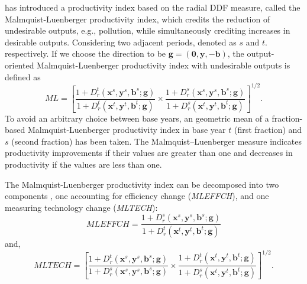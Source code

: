 \cite{Chung1997} has introduced a productivity index based on the radial DDF measure, called the Malmquist-Luenberger productivity index, which credits the reduction of undesirable outputs, e.g., pollution, while simultaneously crediting increases in desirable outputs. Considering two adjacent periods, denoted as $s$ and $t$. respectively. If we choose the direction to be ${\pmb{g}} = (\pmb{0},\pmb{y}, - \pmb{b})$, the output-oriented Malmquist-Luenberger productivity index with undesirable outputs is defined as
\begin{equation}\label{eq_mpi}
    \textit{ML} %
    = {\left[ {
    \frac{{1 + D _r^t({{\pmb{x}}^s},{{\pmb{y}}^s},{{\pmb{b}}^s};{\pmb{g}})}}{{1 + D _r^t({{\pmb{x}}^t},{{\pmb{y}}^t},{{\pmb{b}}^t};{\pmb{g}})}} \times \frac{{1 + D _r^s({{\pmb{x}}^s},{{\pmb{y}}^s},{{\pmb{b}}^s};{\pmb{g}})}}{{1 + D _r^s({{\pmb{x}}^t},{{\pmb{y}}^t},{{\pmb{b}}^t};{\pmb{g}})}}  } \right]^{1/2}}.
\end{equation}
To avoid an arbitrary choice between base years, an geometric mean of a fraction-based Malmquist-Luenberger productivity index in base year $t$ (first fraction) and $s$ (second fraction) has been taken. The Malmquist–Luenberger measure indicates productivity improvements if their values are greater than one and decreases in productivity if the values are less than one. 

The Malmquist-Luenberger productivity index can be decomposed into two components \citep{Chung1997}, one accounting for efficiency change (\textit{MLEFFCH}), and one measuring technology change (\textit{MLTECH}):
\begin{equation}
    \textit{MLEFFCH} %
    = \frac{{1 + D _r^s({{\pmb{x}}^s},{{\pmb{y}}^s},{{\pmb{b}}^s};{\pmb{g}})}}{{1 + D _r^t({{\pmb{x}}^t},{{\pmb{y}}^t},{{\pmb{b}}^t};{\pmb{g}})}}
\end{equation}
and,
\begin{equation}
    \textit{MLTECH} %
    = {\left[ {\frac{{1 + D _r^t({{\pmb{x}}^s},{{\pmb{y}}^s},{{\pmb{b}}^s};{\pmb{g}})}}{{1 + D _r^s({{\pmb{x}}^s},{{\pmb{y}}^s},{{\pmb{b}}^s};{\pmb{g}})}} 
    \times 
    \frac{{1 + D _r^t({{\pmb{x}}^t},{{\pmb{y}}^t},{{\pmb{b}}^t};{\pmb{g}})}}{{1 + D _r^s({{\pmb{x}}^t},{{\pmb{y}}^t},{{\pmb{b}}^t};{\pmb{g}})}}} \right]^{1/2}}.
\end{equation}

